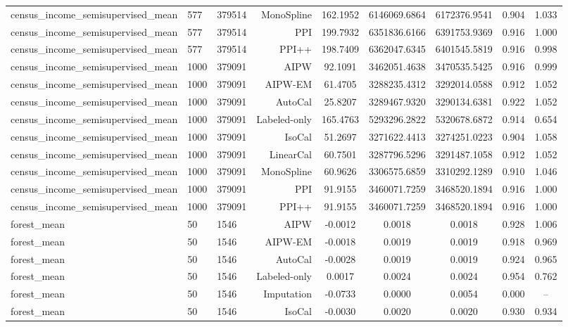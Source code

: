 \begin{tabular}{lllrccccc}
census\_income\_semisupervised\_mean & 577 & 379514 & MonoSpline & 162.1952 & 6146069.6864 & 6172376.9541 & 0.904 & 1.033 \\
census\_income\_semisupervised\_mean & 577 & 379514 & PPI & 199.7932 & 6351836.6166 & 6391753.9369 & 0.916 & 1.000 \\
census\_income\_semisupervised\_mean & 577 & 379514 & PPI++ & 198.7409 & 6362047.6345 & 6401545.5819 & 0.916 & 0.998 \\
census\_income\_semisupervised\_mean & 1000 & 379091 & AIPW & 92.1091 & 3462051.4638 & 3470535.5425 & 0.916 & 0.999 \\
census\_income\_semisupervised\_mean & 1000 & 379091 & AIPW-EM & 61.4705 & 3288235.4312 & 3292014.0588 & 0.912 & 1.052 \\
census\_income\_semisupervised\_mean & 1000 & 379091 & AutoCal & 25.8207 & 3289467.9320 & 3290134.6381 & 0.922 & 1.052 \\
census\_income\_semisupervised\_mean & 1000 & 379091 & Labeled-only & 165.4763 & 5293296.2822 & 5320678.6872 & 0.914 & 0.654 \\
census\_income\_semisupervised\_mean & 1000 & 379091 & IsoCal & 51.2697 & 3271622.4413 & 3274251.0223 & 0.904 & 1.058 \\
census\_income\_semisupervised\_mean & 1000 & 379091 & LinearCal & 60.7501 & 3287796.5296 & 3291487.1058 & 0.912 & 1.052 \\
census\_income\_semisupervised\_mean & 1000 & 379091 & MonoSpline & 60.9626 & 3306575.6859 & 3310292.1289 & 0.910 & 1.046 \\
census\_income\_semisupervised\_mean & 1000 & 379091 & PPI & 91.9155 & 3460071.7259 & 3468520.1894 & 0.916 & 1.000 \\
census\_income\_semisupervised\_mean & 1000 & 379091 & PPI++ & 91.9155 & 3460071.7259 & 3468520.1894 & 0.916 & 1.000 \\
forest\_mean & 50 & 1546 & AIPW & -0.0012 & 0.0018 & 0.0018 & 0.928 & 1.006 \\
forest\_mean & 50 & 1546 & AIPW-EM & -0.0018 & 0.0019 & 0.0019 & 0.918 & 0.969 \\
forest\_mean & 50 & 1546 & AutoCal & -0.0028 & 0.0019 & 0.0019 & 0.924 & 0.965 \\
forest\_mean & 50 & 1546 & Labeled-only & 0.0017 & 0.0024 & 0.0024 & 0.954 & 0.762 \\
forest\_mean & 50 & 1546 & Imputation & -0.0733 & 0.0000 & 0.0054 & 0.000 & -- \\
forest\_mean & 50 & 1546 & IsoCal & -0.0030 & 0.0020 & 0.0020 & 0.930 & 0.934 \\

\end{tabular}

